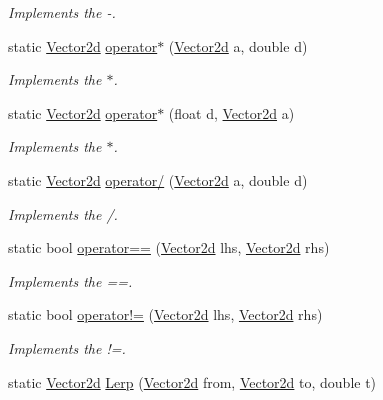 \begin{DoxyCompactItemize}
\begin{DoxyCompactList}\small\item\em Implements the -\/. \end{DoxyCompactList}\item 
static \hyperlink{struct_unity_engine_1_1_vector2d}{Vector2d} \hyperlink{struct_unity_engine_1_1_vector2d_a086e9765590c6e2d5048e4eb5af9bcfc}{operator$\ast$} (\hyperlink{struct_unity_engine_1_1_vector2d}{Vector2d} a, double d)
\begin{DoxyCompactList}\small\item\em Implements the $\ast$. \end{DoxyCompactList}\item 
static \hyperlink{struct_unity_engine_1_1_vector2d}{Vector2d} \hyperlink{struct_unity_engine_1_1_vector2d_afa5287efd4558c88ff2f063090b807df}{operator$\ast$} (float d, \hyperlink{struct_unity_engine_1_1_vector2d}{Vector2d} a)
\begin{DoxyCompactList}\small\item\em Implements the $\ast$. \end{DoxyCompactList}\item 
static \hyperlink{struct_unity_engine_1_1_vector2d}{Vector2d} \hyperlink{struct_unity_engine_1_1_vector2d_a58cd30f3af06aea76058807d9fb22744}{operator/} (\hyperlink{struct_unity_engine_1_1_vector2d}{Vector2d} a, double d)
\begin{DoxyCompactList}\small\item\em Implements the /. \end{DoxyCompactList}\item 
static bool \hyperlink{struct_unity_engine_1_1_vector2d_a72dd725398e776616eeed4d03fe41ad2}{operator==} (\hyperlink{struct_unity_engine_1_1_vector2d}{Vector2d} lhs, \hyperlink{struct_unity_engine_1_1_vector2d}{Vector2d} rhs)
\begin{DoxyCompactList}\small\item\em Implements the ==. \end{DoxyCompactList}\item 
static bool \hyperlink{struct_unity_engine_1_1_vector2d_a6e8cd4a21aadcdbdcf68465a7b3a6b07}{operator!=} (\hyperlink{struct_unity_engine_1_1_vector2d}{Vector2d} lhs, \hyperlink{struct_unity_engine_1_1_vector2d}{Vector2d} rhs)
\begin{DoxyCompactList}\small\item\em Implements the !=. \end{DoxyCompactList}\item 
static \hyperlink{struct_unity_engine_1_1_vector2d}{Vector2d} \hyperlink{struct_unity_engine_1_1_vector2d_a17b30495c218cfee9ed164585a74c67a}{Lerp} (\hyperlink{struct_unity_engine_1_1_vector2d}{Vector2d} from, \hyperlink{struct_unity_engine_1_1_vector2d}{Vector2d} to, double t)

\end{DoxyCompactItemize}
